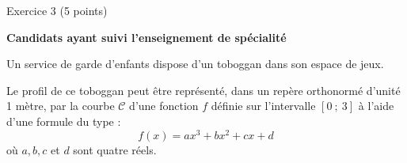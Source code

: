 
%
\begin{h2}Exercice 3 (5 points)\end{h2}
\par      
\textbf{Candidats ayant suivi l'enseignement de spécialité}
\par
%
%
\par
Un service de garde d'enfants dispose d'un toboggan dans son espace de jeux.
\par
Le profil de ce toboggan peut être représenté, dans un repère orthonormé d'unité 1 mètre, par la courbe $\mathscr{C}$ d'une fonction $f$ définie sur l'intervalle $[0~;~3]$ à l'aide d'une formule du type :
\[ f(x)=ax^3+bx^2+cx+d \]
où $a, b, c$ et $d$ sont quatre réels.
\par

